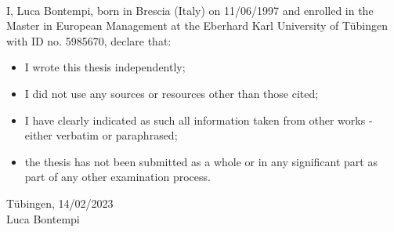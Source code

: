 
%

\begin{center}

\end{center}
\begin{center}

{\bf\fontsize{14pt}{14.5pt}\selectfont {Formal Declaration}}\\\vspace{1cm}
\end{center}

\setlength{\parindent}{0cm}



I, Luca Bontempi, born in Brescia (Italy) on 11/06/1997 and enrolled in the Master in European Management at the Eberhard Karl University of Tübingen with ID no. 5985670, declare that:
\begin{itemize}
    \item I wrote this thesis independently;
    \item I did not use any sources or resources other than those cited;
    \item I have clearly indicated as such all information taken from other works - either verbatim or paraphrased;
    \item the thesis has not been submitted as a whole or in any significant part as part of any other examination process.
\end{itemize}
\vspace{\baselineskip}
\vspace{\baselineskip}
\vspace{\baselineskip}
\vspace{\baselineskip}
\vspace{\baselineskip}
\vspace{\baselineskip}
Tübingen, 14/02/2023\\
Luca Bontempi\\


